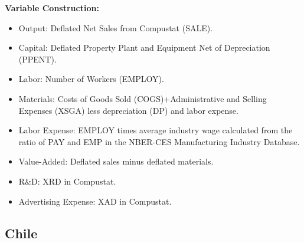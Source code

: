\documentclass[12pt]{article}
\begin{document}
\begin{appendices}
\textbf{Variable Construction:}
\begin{itemize}
	\item Output: Deflated Net Sales from Compustat (SALE).
	\item Capital: Deflated Property Plant and Equipment Net of Depreciation (PPENT).
	\item Labor: Number of Workers (EMPLOY).
	\item Materials: Costs of Goods Sold (COGS)+Administrative and Selling Expenses (XSGA) less depreciation (DP) and labor expense.
	\item Labor Expense: EMPLOY times average industry wage calculated from the ratio of PAY and EMP in the NBER-CES Manufacturing Industry Database.
	\item Value-Added: Deflated sales minus deflated materials.
	\item R\&D: XRD in Compustat.
	\item Advertising Expense: XAD in Compustat.
\end{itemize}

\subsection{Chile} \label{CHLdata}


\end{appendices}
\end{document}
